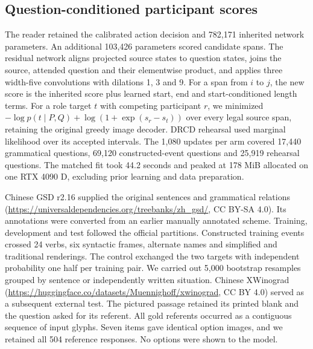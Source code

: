 \subsection*{Question-conditioned participant scores}
The reader retained the calibrated action decision and 782,171 inherited network parameters. An additional 103,426 parameters scored candidate spans. The residual network aligns projected source states to question states, joins the source, attended question and their elementwise product, and applies three width-five convolutions with dilations 1, 3 and 9. For a span from $i$ to $j$, the new score is the inherited score plus learned start, end and start-conditioned length terms. For a role target $t$ with competing participant $r$, we minimized $-\log p(t\mid P,Q)+\log(1+\exp(s_r-s_t))$ over every legal source span, retaining the original greedy image decoder. DRCD rehearsal used marginal likelihood over its accepted intervals. The 1,080 updates per arm covered 17,440 grammatical questions, 69,120 constructed-event questions and 25,919 rehearsal questions. The matched fit took 44.2 seconds and peaked at 178 MiB allocated on one RTX 4090 D, excluding prior learning and data preparation.

Chinese GSD r2.16 supplied the original sentences and grammatical relations (\url{https://universaldependencies.org/treebanks/zh_gsd/}, CC BY-SA 4.0). Its annotations were converted from an earlier manually annotated scheme. Training, development and test followed the official partitions. Constructed training events crossed 24 verbs, six syntactic frames, alternate names and simplified and traditional renderings. The control exchanged the two targets with independent probability one half per training pair. We carried out 5,000 bootstrap resamples grouped by sentence or independently written situation. Chinese XWinograd (\url{https://huggingface.co/datasets/Muennighoff/xwinograd}, CC BY 4.0) served as a subsequent external test. The pictured passage retained its printed blank and the question asked for its referent. All gold referents occurred as a contiguous sequence of input glyphs. Seven items gave identical option images, and we retained all 504 reference responses. No options were shown to the model.
